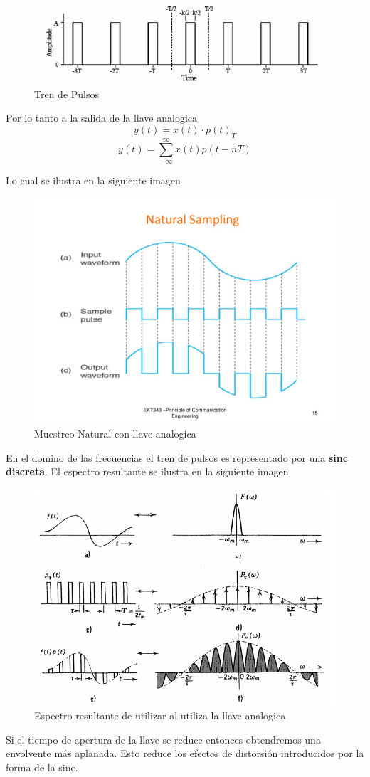 \begin{figure}[H]
	\centering
	\includegraphics[width=0.7\linewidth]{"../Ejercicio-3/ImagenesEjercicio3/Tren de Pulsos"}
	\caption{Tren de Pulsos}
	\label{fig:tren-de-pulsos}
\end{figure}
Por lo tanto a la salida de la llave analogica
\begin{equation}
y(t)=x(t)\cdot p(t)_{T}
\end{equation}
\begin{equation}
y(t)=\sum_{-\infty}^{\infty}x(t)p(t-nT)
\end{equation}

Lo cual se ilustra en la siguiente imagen
\begin{figure}[H]
	\centering
	\includegraphics[width=0.7\linewidth]{../Ejercicio-3/ImagenesEjercicio3/natural-sampling1-l}
	\caption{Muestreo Natural con llave analogica}
	\label{fig:natural-sampling1-l}
\end{figure}

En el domino de las frecuencias el tren de pulsos es representado por una \textbf{sinc discreta}. El espectro resultante se ilustra en la siguiente imagen
	
\begin{figure}[H]
	\centering
	\includegraphics[width=0.7\linewidth]{../Ejercicio-3/ImagenesEjercicio3/Espectro}
	\caption{Espectro resultante de utilizar al utiliza la llave analogica}
	\label{fig:espectro}
\end{figure}

Si el tiempo de apertura de la llave se reduce entonces obtendremos una envolvente más aplanada. Esto reduce los efectos de distorsión introducidos por la forma de la sinc.

